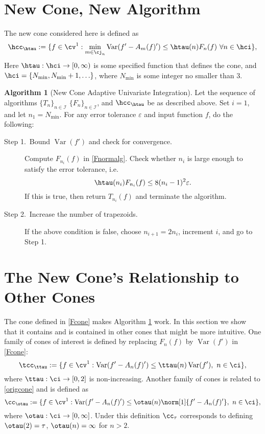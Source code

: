 \documentclass[]{elsarticle}
\DeclareMathOperator{\Var}{Var}
\theoremstyle{definition}
\newtheorem{algo}{Algorithm}
\theoremstyle{remark}
\begin{document}
\section{New Cone, New Algorithm}
The new cone considered here is defined as
\begin{equation} \label{Fcone}
\hcc_{\htau}:= \{ f \in \cv^1 :  \min_{m \in \cj_n} \Var(f'-A_m(f)') \le \htau(n) F_n(f) \ \forall n \in \hci \},
\end{equation}
Here $\htau : \hci \to [0,\infty)$ is some specified function that defines the cone, and $\hci=\{N_{\min}, N_{\min}+1, \ldots \}$, where $N_{\min}$ is some integer no smaller than $3$.  
\begin{algo}[New Cone Adaptive Univariate Integration] \label{newconealgo}
Let the sequence of algorithms $\{T_n\}_{n\in \mathcal{I}}$ $\{F_n\}_{n\in \mathcal{I}}$, and $\hcc_{\htau}$ be as described above.  Set $i=1$, and let $n_1=N_{\min}$. For any error tolerance $\varepsilon$ and input function $f$, do the following:
\begin{description}
\item[Step 1.\ Bound {$\Var(f')$} and check for convergence.] Compute $F_{n_i}(f)$ in \eqref{Fnormalg}.  Check whether $n_i$ is large enough to satisfy the error tolerance, i.e.
    \begin{equation*}
      \htau(n_i) F_{n_i}(f) \le 8 (n_i-1)^2 \varepsilon.
    \end{equation*}
If this is true, then return $T_{n_i}(f)$ and terminate the algorithm.   

\item[Step 2.\ Increase the number of trapezoids.]  If the above condition is false, choose $n_{i+1}=2n_i$, increment $i$, and go to Step 1.
\end{description}
\end{algo}


\section{The New Cone's Relationship to Other Cones}

The cone defined in \eqref{Fcone} makes Algorithm \ref{newconealgo} work.  In this section we show that it contains and is contained in other cones that might be more intuitive.  One family of cones of interest is defined by replacing $F_n(f)$ by $\Var(f')$ in \eqref{Fcone}:
\begin{equation}\label{varcone}
\tcc_{\ttau}:=\{f\in \cv^{1}:\Var(f'-A_n(f)')\leq\ttau(n)\Var(f'), \ n \in  \ci\},
\end{equation}
where $\ttau:\ci \to [0,2]$ is non-increasing.  Another family of cones is related to \eqref{origcone} and is defined as
\begin{equation}\label{origconefamily}
\cc_{\otau}:=\{f\in \cv^{1}:\Var(f'-A_n(f)')\leq\otau(n)\norm[1]{f'-A_n(f)'}, \ n \in  \ci\},
\end{equation}
where $\otau:\ci \to [0,\infty]$.  Under this definition $\cc_{\tau}$ corresponds to defining $\otau(2)=\tau$, $\otau(n)=\infty$ for $n>2$.
\end{document}
